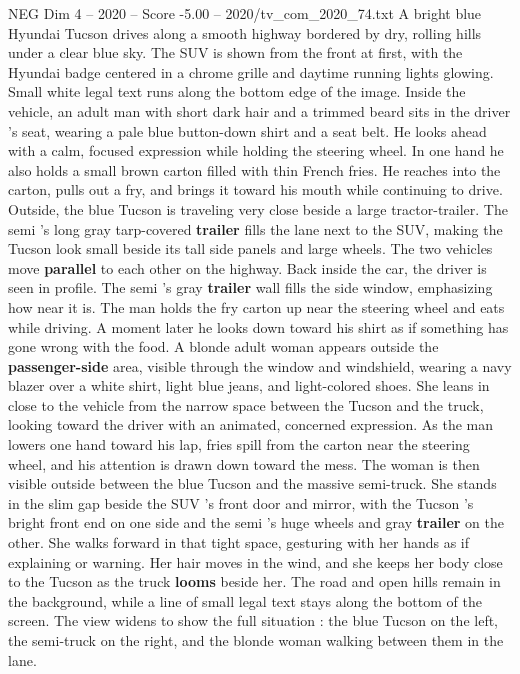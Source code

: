 \begin{textsample}{NEG Dim 4 – 2020 – Score -5.00 – 2020/tv\_com\_2020\_74.txt}  \label{ex:f4_neg_081}
A bright blue Hyundai Tucson drives along a smooth highway bordered by dry, rolling hills under a clear blue sky.
The SUV is shown from the front at first, with the Hyundai badge centered in a chrome grille and daytime running lights glowing.
Small white legal text runs along the bottom edge of the image.
Inside the vehicle, an adult man with short dark hair and a trimmed beard sits in the driver ’s seat, wearing a pale blue button-down shirt and a seat belt.
He looks ahead with a calm, focused expression while holding the steering wheel.
In one hand he also holds a small brown carton filled with thin French fries.
He reaches into the carton, pulls out a fry, and brings it toward his mouth while continuing to drive.
Outside, the blue Tucson is traveling very close beside a large tractor-trailer.
The semi ’s long gray tarp-covered \textbf{trailer} fills the lane next to the SUV, making the Tucson look small beside its tall side panels and large wheels.
The two vehicles move \textbf{parallel} to each other on the highway.
Back inside the car, the driver is seen in profile.
The semi ’s gray \textbf{trailer} wall fills the side window, emphasizing how near it is.
The man holds the fry carton up near the steering wheel and eats while driving.
A moment later he looks down toward his shirt as if something has gone wrong with the food.
A blonde adult woman appears outside the \textbf{passenger-side} area, visible through the window and windshield, wearing a navy blazer over a white shirt, light blue jeans, and light-colored shoes.
She leans in close to the vehicle from the narrow space between the Tucson and the truck, looking toward the driver with an animated, concerned expression.
As the man lowers one hand toward his lap, fries spill from the carton near the steering wheel, and his attention is drawn down toward the mess.
The woman is then visible outside between the blue Tucson and the massive semi-truck.
She stands in the slim gap beside the SUV ’s front door and mirror, with the Tucson ’s bright front end on one side and the semi ’s huge wheels and gray \textbf{trailer} on the other.
She walks forward in that tight space, gesturing with her hands as if explaining or warning.
Her hair moves in the wind, and she keeps her body close to the Tucson as the truck \textbf{looms} beside her.
The road and open hills remain in the background, while a line of small legal text stays along the bottom of the screen.
The view widens to show the full situation : the blue Tucson on the left, the semi-truck on the right, and the blonde woman walking between them in the lane.

\end{textsample}
